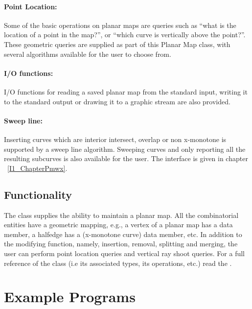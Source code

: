\paragraph{Point Location:}

Some of the basic operations on planar maps are queries such as ``what is the location of a point in the map?'', or ``which curve is vertically above the point?''.
These geometric queries are supplied as part of this Planar Map class, with 
several algorithms available for the user to choose from.

\paragraph{I/O functions:}
I/O functions for reading a saved planar map from the standard input, 
writing it to the standard output or drawing it to a graphic stream are also provided.

\paragraph{Sweep line:}
Inserting curves which are interior intersect, overlap or non x-monotone is supported by a sweep line algorithm.
Sweeping curves and only reporting all the resulting subcurves is also available for the user.
The interface is given in chapter  ~\ref{I1_ChapterPmwx}.

\subsection*{Functionality}

The class   supplies the ability to maintain
a planar map. All the combinatorial entities have a geometric mapping, e.g.,
a vertex of a planar map has a  data member, a halfedge has
a  (x-monotone curve) data member, etc. In addition to the 
modifying function, namely, insertion, removal, splitting and merging, the user
can perform point location queries and vertical ray shoot queries.
For a full reference of the class (i.e its associated types,
its operations, etc.) read the .

\section{Example Programs}
\label{PM_sec:example}


